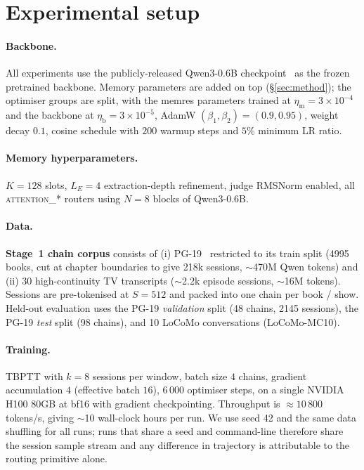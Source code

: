\documentclass{article}
\begin{document}
\section{Experimental setup}
\label{sec:setup}

\paragraph{Backbone.}
All experiments use the publicly-released Qwen3-0.6B
checkpoint~\cite{qwen3} as the frozen pretrained backbone. Memory
parameters are added on top (\S\ref{sec:method}); the optimiser
groups are split, with the memres parameters trained at $\eta_{\text{m}} = 3\!\times\!10^{-4}$
and the backbone at $\eta_{\text{b}} = 3\!\times\!10^{-5}$, AdamW
$(\beta_1, \beta_2) = (0.9, 0.95)$, weight decay $0.1$, cosine schedule with
$200$ warmup steps and $5\%$ minimum LR ratio.

\paragraph{Memory hyperparameters.} $K = 128$ slots, $L_E = 4$
extraction-depth refinement, judge RMSNorm enabled, all
\textsc{attention\_*} routers using $N = 8$ blocks of Qwen3-0.6B.

\paragraph{Data.}
\textbf{Stage~1 chain corpus} consists of (i) PG-19~\cite{rae2019compressive}
restricted to its train split (4995 books, cut at chapter
boundaries to give 218k sessions, $\sim$470M Qwen tokens) and (ii) 30
high-continuity TV transcripts ($\sim$2.2k episode sessions,
$\sim$16M tokens). Sessions are pre-tokenised at $S=512$ and packed
into one chain per book / show. Held-out evaluation uses the PG-19
\emph{validation} split (48 chains, 2145 sessions), the
PG-19 \emph{test} split (98 chains), and 10 LoCoMo conversations
(LoCoMo-MC10).

\paragraph{Training.}
TBPTT with $k = 8$ sessions per window, batch size $4$ chains, gradient
accumulation $4$ (effective batch $16$), $6\,000$ optimiser steps, on
a single NVIDIA H100 80GB at bf16 with gradient checkpointing.
Throughput is $\approx\!10\,800$ tokens/s, giving $\sim$10 wall-clock hours
per run. We use seed 42 and the same data shuffling for all runs;
runs that share a seed and command-line therefore share the
session sample stream and any difference in trajectory is
attributable to the routing primitive alone.
\end{document}

